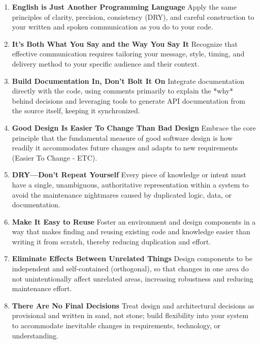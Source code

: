 \documentclass[11pt]{article}
\begin{document}
\begin{enumerate}[label=\arabic*., start=11, itemsep=1ex]
    \item \textbf{English is Just Another Programming Language}
    Apply the same principles of clarity, precision, consistency (DRY), and careful construction to your written and spoken communication as you do to your code.

    \item \textbf{It's Both What You Say and the Way You Say It}
    Recognize that effective communication requires tailoring your message, style, timing, and delivery method to your specific audience and their context.

    \item \textbf{Build Documentation In, Don't Bolt It On}
    Integrate documentation directly with the code, using comments primarily to explain the *why* behind decisions and leveraging tools to generate API documentation from the source itself, keeping it synchronized.

    \item \textbf{Good Design Is Easier To Change Than Bad Design}
    Embrace the core principle that the fundamental measure of good software design is how readily it accommodates future changes and adapts to new requirements (Easier To Change - ETC).

    \item \textbf{DRY—Don’t Repeat Yourself}
    Every piece of knowledge or intent must have a single, unambiguous, authoritative representation within a system to avoid the maintenance nightmares caused by duplicated logic, data, or documentation.

    \item \textbf{Make It Easy to Reuse}
    Foster an environment and design components in a way that makes finding and reusing existing code and knowledge easier than writing it from scratch, thereby reducing duplication and effort.

    \item \textbf{Eliminate Effects Between Unrelated Things}
    Design components to be independent and self-contained (orthogonal), so that changes in one area do not unintentionally affect unrelated areas, increasing robustness and reducing maintenance effort.

    \item \textbf{There Are No Final Decisions}
    Treat design and architectural decisions as provisional and written in sand, not stone; build flexibility into your system to accommodate inevitable changes in requirements, technology, or understanding.


\end{enumerate}
\end{document}
